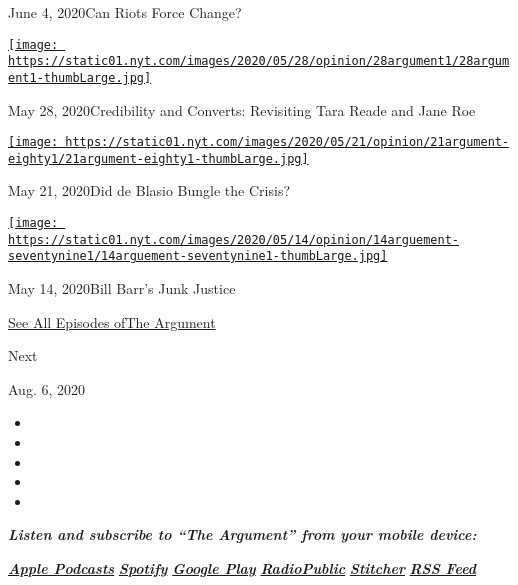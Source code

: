 June 4, 2020Can Riots Force Change?

\href{https://www.nytimes.com/2020/05/28/opinion/the-argument-tara-reade-norma-mccorvey.html?action=click\&module=audio-series-bar\&region=header\&pgtype=Article}{\texttt{[image: https://static01.nyt.com/images/2020/05/28/opinion/28argument1/28argument1-thumbLarge.jpg]}}

May 28, 2020Credibility and Converts: Revisiting Tara Reade and Jane Roe

\href{https://www.nytimes.com/2020/05/21/opinion/the-argument-de-blasio-cuomo-coronavirus.html?action=click\&module=audio-series-bar\&region=header\&pgtype=Article}{\texttt{[image: https://static01.nyt.com/images/2020/05/21/opinion/21argument-eighty1/21argument-eighty1-thumbLarge.jpg]}}

May 21, 2020Did de Blasio Bungle the Crisis?

\href{https://www.nytimes.com/2020/05/14/opinion/the-argument-flynn-barr-coronavirus.html?action=click\&module=audio-series-bar\&region=header\&pgtype=Article}{\texttt{[image: https://static01.nyt.com/images/2020/05/14/opinion/14arguement-seventynine1/14arguement-seventynine1-thumbLarge.jpg]}}

May 14, 2020Bill Barr's Junk Justice

\href{https://www.nytimes.com/column/the-argument}{See All Episodes
ofThe Argument}

Next

Aug. 6, 2020

\begin{itemize}
\item
\item
\item
\item
\item
\end{itemize}

\emph{\textbf{Listen and subscribe to ``The Argument'' from your mobile
device:}}

\textbf{\href{https://itunes.apple.com/us/podcast/the-argument/id1438024613?mt=2}{\emph{Apple
Podcasts}}} \emph{\textbf{\textbar{}}}
\textbf{\href{https://open.spotify.com/show/6bmhSFLKtApYClEuSH8q42}{\emph{Spotify}}}
\emph{\textbf{\textbar{}}}
\textbf{\href{https://play.google.com/music/m/Idxib4hsg3yviao4gtym76knjjy?t=The_Argument}{\emph{Google
Play}}} \emph{\textbf{\textbar{}}}
\textbf{\href{https://radiopublic.com/the-argument-Wdbepr}{\emph{RadioPublic}}}
\emph{\textbf{\textbar{}}}
\textbf{\href{https://www.stitcher.com/podcast/the-new-york-times/the-argument}{\emph{Stitcher}}}
\emph{\textbf{\textbar{}}}
\textbf{\href{https://rss.art19.com/the-argument}{\emph{RSS Feed}}}

